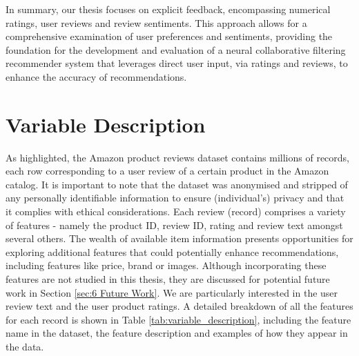   In summary, our thesis focuses on explicit feedback, encompassing numerical ratings, user reviews and review sentiments. This approach allows for a comprehensive examination of user preferences and sentiments, providing the foundation for the development and evaluation of a neural collaborative filtering recommender system that leverages direct user input, via ratings and reviews, to enhance the accuracy of recommendations.




\section{Variable Description}
\label{sec:3 Variable Description}

As highlighted, the Amazon product reviews dataset contains millions of records, each row corresponding to a user review of a certain product in the Amazon catalog. It is important to note that the dataset was anonymised and stripped of any personally identifiable information to ensure (individual's) privacy and that it complies with ethical considerations. Each review (record) comprises a variety of features - namely the product ID, review ID, rating and review text amongst several others. The wealth of available item information presents opportunities for exploring  additional features that could potentially enhance recommendations, including features like price, brand or images. Although incorporating these features are not studied in this thesis, they are discussed for potential future work in Section \ref{sec:6 Future Work}. We are particularly interested in the user review text and the user product ratings. A detailed breakdown of all the features for each record is shown in Table \ref{tab:variable_description}, including the feature name in the dataset, the feature description and examples of how they appear in the data.

